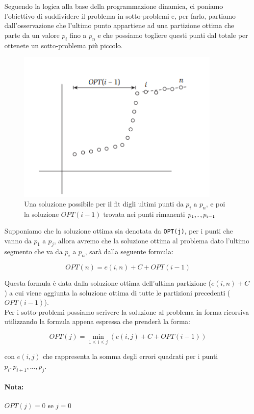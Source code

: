 Seguendo la logica alla base della programmazione dinamica, ci poniamo
l'obiettivo di suddividere il problema in sotto-problemi e, per farlo,
partiamo dall'osservazione che l'ultimo punto appartiene ad una
partizione ottima che parte da un valore $p_i$ fino a $p_n$ e che
possiamo togliere questi punti dal totale per ottenete un sotto-problema
più piccolo.
\begin{figure}[H]
  \centering
  \includegraphics[width = 10cm, keepaspectratio]{capitoli/programmazione_dinamica/imgs/llsqr_funzionamento.png}
  \centering
  \caption{Una soluzione possibile per il fit digli ultimi punti da $p_i$ a $p_n$,
    e poi la soluzione $OPT(i-1)$ trovata nei punti rimanenti $p_1, \ldotp, p_{i-1}$}
\end{figure}
Supponiamo che la soluzione ottima sia denotata da
\texttt{OPT(j)}, per i punti che vanno da $p_1$ a $p_j$, allora
avremo che la soluzione ottima al problema dato l'ultimo segmento che va
da $p_i$ a $p_n$, sarà dalla seguente formula:

$$
  OPT(n) = e(i,n) + C + OPT(i - 1)
$$

Questa formula è data dalla soluzione ottima dell'ultima partizione ($e(i,n) +
  C$) a cui viene aggiunta la soluzione ottima di tutte le partizioni precedenti
($OPT(i -1)$).\\

Per i sotto-problemi possiamo scrivere la soluzione al problema in forma
ricorsiva utilizzando la formula appena espressa che prenderà la forma:

$$
  OPT(j) = \min_{1 \leq i \leq j}(e(i,j) + C + OPT(i - 1))
$$

con $e(i,j)$ che rappresenta la somma degli errori quadrati per i punti $p_i,
  p_{i+1},..., p_j$.

\paragraph*{Nota:} $OPT(j) = 0$ se $j=0$\\

